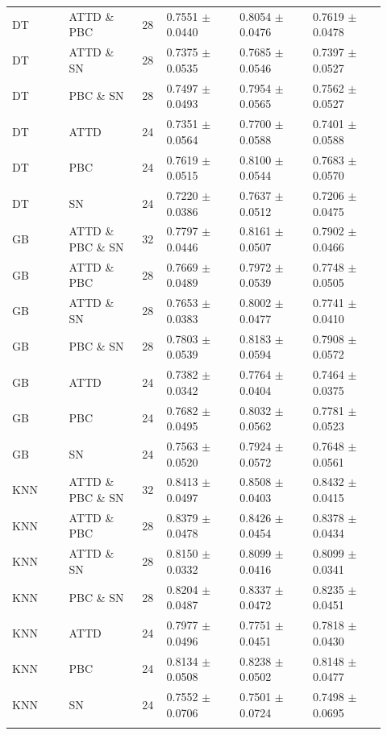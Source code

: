 \documentclass[10pt,a4paper]{article}
\newcommand{\classifiersep}{\addlinespace[1pt]\midrule\addlinespace[1pt]}
\begin{document}
\begin{landscape}
\begin{longtable}{@{}L{0.14\linewidth}L{0.18\linewidth}C{0.06\linewidth}C{0.18\linewidth}C{0.18\linewidth}C{0.18\linewidth}@{}}
DT & ATTD \& PBC & 28 & 0.7551 $\pm$ 0.0440 & 0.8054 $\pm$ 0.0476 & 0.7619 $\pm$ 0.0478 \\
DT & ATTD \& SN & 28 & 0.7375 $\pm$ 0.0535 & 0.7685 $\pm$ 0.0546 & 0.7397 $\pm$ 0.0527 \\
DT & PBC \& SN & 28 & 0.7497 $\pm$ 0.0493 & 0.7954 $\pm$ 0.0565 & 0.7562 $\pm$ 0.0527 \\
DT & ATTD & 24 & 0.7351 $\pm$ 0.0564 & 0.7700 $\pm$ 0.0588 & 0.7401 $\pm$ 0.0588 \\
DT & PBC & 24 & 0.7619 $\pm$ 0.0515 & 0.8100 $\pm$ 0.0544 & 0.7683 $\pm$ 0.0570 \\
DT & SN & 24 & 0.7220 $\pm$ 0.0386 & 0.7637 $\pm$ 0.0512 & 0.7206 $\pm$ 0.0475 \\
\classifiersep
GB & ATTD \& PBC \& SN & 32 & 0.7797 $\pm$ 0.0446 & 0.8161 $\pm$ 0.0507 & 0.7902 $\pm$ 0.0466 \\
GB & ATTD \& PBC & 28 & 0.7669 $\pm$ 0.0489 & 0.7972 $\pm$ 0.0539 & 0.7748 $\pm$ 0.0505 \\
GB & ATTD \& SN & 28 & 0.7653 $\pm$ 0.0383 & 0.8002 $\pm$ 0.0477 & 0.7741 $\pm$ 0.0410 \\
GB & PBC \& SN & 28 & 0.7803 $\pm$ 0.0539 & 0.8183 $\pm$ 0.0594 & 0.7908 $\pm$ 0.0572 \\
GB & ATTD & 24 & 0.7382 $\pm$ 0.0342 & 0.7764 $\pm$ 0.0404 & 0.7464 $\pm$ 0.0375 \\
GB & PBC & 24 & 0.7682 $\pm$ 0.0495 & 0.8032 $\pm$ 0.0562 & 0.7781 $\pm$ 0.0523 \\
GB & SN & 24 & 0.7563 $\pm$ 0.0520 & 0.7924 $\pm$ 0.0572 & 0.7648 $\pm$ 0.0561 \\
\classifiersep
KNN & ATTD \& PBC \& SN & 32 & 0.8413 $\pm$ 0.0497 & 0.8508 $\pm$ 0.0403 & 0.8432 $\pm$ 0.0415 \\
KNN & ATTD \& PBC & 28 & 0.8379 $\pm$ 0.0478 & 0.8426 $\pm$ 0.0454 & 0.8378 $\pm$ 0.0434 \\
KNN & ATTD \& SN & 28 & 0.8150 $\pm$ 0.0332 & 0.8099 $\pm$ 0.0416 & 0.8099 $\pm$ 0.0341 \\
KNN & PBC \& SN & 28 & 0.8204 $\pm$ 0.0487 & 0.8337 $\pm$ 0.0472 & 0.8235 $\pm$ 0.0451 \\
KNN & ATTD & 24 & 0.7977 $\pm$ 0.0496 & 0.7751 $\pm$ 0.0451 & 0.7818 $\pm$ 0.0430 \\
KNN & PBC & 24 & 0.8134 $\pm$ 0.0508 & 0.8238 $\pm$ 0.0502 & 0.8148 $\pm$ 0.0477 \\
KNN & SN & 24 & 0.7552 $\pm$ 0.0706 & 0.7501 $\pm$ 0.0724 & 0.7498 $\pm$ 0.0695 \\
\classifiersep

\end{longtable}
\end{landscape}
\end{document}

